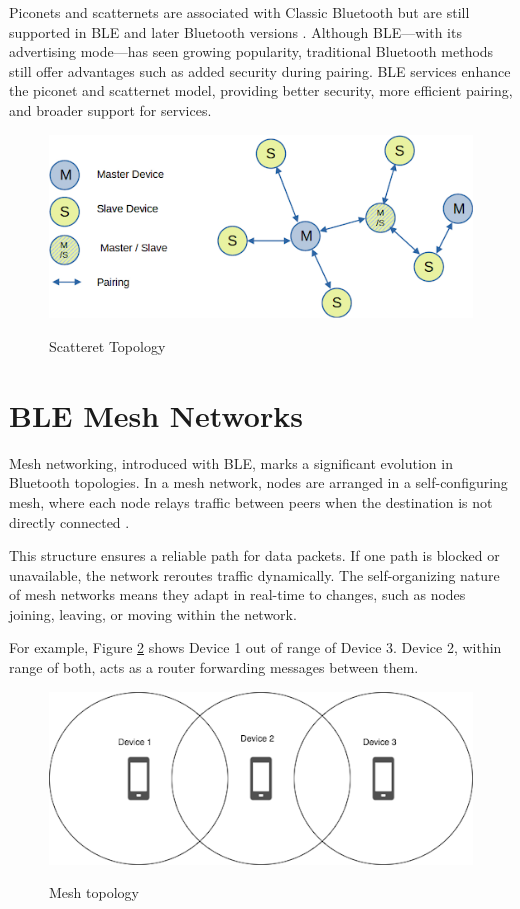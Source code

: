 Piconets and scatternets are associated with Classic Bluetooth but are still supported in BLE and later Bluetooth versions \cite{nextgenBLE}. Although BLE—with its advertising mode—has seen growing popularity, traditional Bluetooth methods still offer advantages such as added security during pairing. BLE services enhance the piconet and scatternet model, providing better security, more efficient pairing, and broader support for services.

\begin{figure}[h]
    \caption{Scatteret Topology}
    \includegraphics[scale=.7]{scatternet.png}
    \label{fig:scatternet}
    \end{figure}

\section{BLE Mesh Networks}

Mesh networking, introduced with BLE, marks a significant evolution in Bluetooth topologies. In a mesh network, nodes are arranged in a self-configuring mesh, where each node relays traffic between peers when the destination is not directly connected \cite{buildingBLEsystems}.

This structure ensures a reliable path for data packets. If one path is blocked or unavailable, the network reroutes traffic dynamically. The self-organizing nature of mesh networks means they adapt in real-time to changes, such as nodes joining, leaving, or moving within the network.

For example, Figure \ref{fig:mesh} shows Device 1 out of range of Device 3. Device 2, within range of both, acts as a router forwarding messages between them.
\begin{figure}[h]
    \caption{Mesh topology}
    \includegraphics{mesh.png}
    \label{fig:mesh}
    \end{figure}

